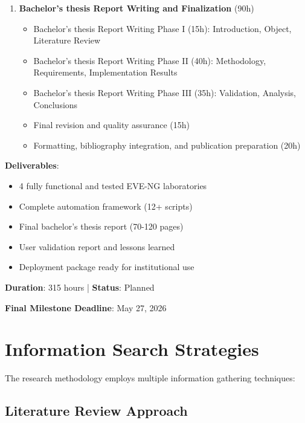 \begin{enumerate}
\item \textbf{Bachelor's thesis Report Writing and Finalization} (90h)
\begin{itemize}
\item Bachelor's thesis Report Writing Phase I (15h): Introduction, Object, Literature Review
\item Bachelor's thesis Report Writing Phase II (40h): Methodology, Requirements, Implementation Results
\item Bachelor's thesis Report Writing Phase III (35h): Validation, Analysis, Conclusions
\item Final revision and quality assurance (15h)
\item Formatting, bibliography integration, and publication preparation (20h)
\end{itemize}

\end{enumerate}

\textbf{Deliverables}:
\begin{itemize}
\item 4 fully functional and tested EVE-NG laboratories
\item Complete automation framework (12+ scripts)
\item Final bachelor's thesis report (70-120 pages)
\item User validation report and lessons learned
\item Deployment package ready for institutional use
\end{itemize}

\textbf{Duration}: 315 hours | \textbf{Status}: Planned

\textbf{Final Milestone Deadline}: May 27, 2026

\section{Information Search Strategies}

The research methodology employs multiple information gathering techniques:

\subsection{Literature Review Approach}

